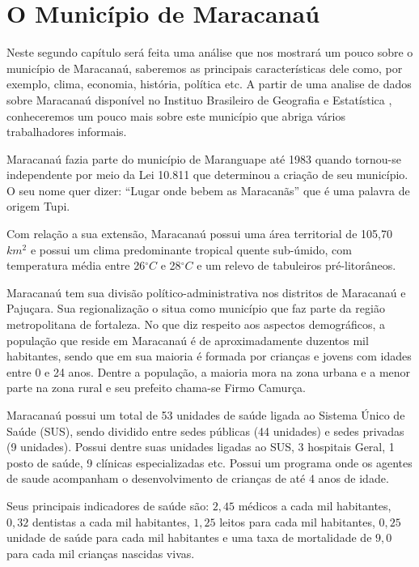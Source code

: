 \chapter{O Município de Maracanaú}

Neste segundo capítulo será feita uma análise que nos mostrará um pouco sobre o município de Maracanaú, saberemos as principais características dele como, por exemplo, clima, economia, história, política etc. A partir de uma analise de dados sobre Maracanaú disponível no Instituo Brasileiro de Geografia e Estatística \cite{demografico2000resultados}, conheceremos um pouco mais sobre este município que abriga vários trabalhadores informais. 

Maracanaú fazia parte do município de Maranguape até 1983 quando tornou-se independente por meio da Lei 10.811 que determinou a criação de seu município. O seu nome quer dizer: ``Lugar onde bebem as Maracanãs'' que é uma palavra de origem Tupi. 

Com relação a sua extensão, Maracanaú possui uma área territorial de 105,70 $km^2$ e possui um clima predominante tropical quente sub-úmido, com temperatura média entre 26$^{\circ}C$ e 28$^{\circ}C$ e um relevo de tabuleiros pré-litorâneos.

Maracanaú tem sua divisão político-administrativa nos distritos de Maracanaú e Pajuçara. Sua regionalização o situa como município que faz parte da região metropolitana de fortaleza. No que diz respeito aos aspectos demográficos, a população que reside em Maracanaú é de aproximadamente duzentos mil habitantes, sendo que em sua maioria é formada por crianças e jovens com idades entre 0 e 24 anos. Dentre a população, a maioria mora na zona urbana e a menor parte na zona rural e seu prefeito chama-se Firmo Camurça.

Maracanaú possui um total de 53 unidades de saúde ligada ao Sistema Único de Saúde (SUS), sendo dividido entre sedes públicas (44 unidades) e sedes privadas (9 unidades). Possui dentre suas unidades ligadas ao SUS, 3 hospitais Geral, 1 posto de saúde, 9 clínicas especializadas etc. Possui um programa onde os agentes de saude acompanham o desenvolvimento de crianças de até 4 anos de idade.

Seus principais indicadores de saúde são: $2,45$ médicos a cada mil habitantes, $0,32$ dentistas a cada mil
habitantes, $1,25$ leitos para cada mil habitantes, $0,25$ unidade de saúde para cada mil habitantes e uma 
taxa de mortalidade de $9,0$ para cada mil crianças nascidas vivas.

